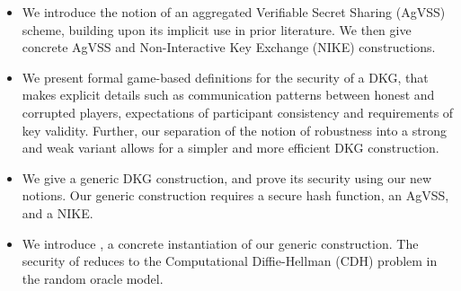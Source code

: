 \begin{itemize}
  \item We introduce the notion of an aggregated Verifiable Secret Sharing (AgVSS) scheme,
    building upon its implicit use in prior literature.
    We then give concrete AgVSS and Non-Interactive Key Exchange (NIKE) constructions.
  \item We present formal game-based definitions for the security of a DKG,
    that makes explicit details such as communication patterns between honest and corrupted players,
    expectations of participant consistency and requirements of key validity.
    Further, our separation of the notion of robustness into a strong and weak variant allows for
    a simpler and more efficient DKG construction.
  \item We give a generic DKG construction,
    and prove its security using our new notions.
    Our generic construction requires a secure hash function, an AgVSS, and a NIKE.
  \item We introduce \RG, a concrete instantiation of our generic
    construction.
    The security of \RG reduces to the Computational Diffie-Hellman (CDH)
    problem in the random oracle model.
\end{itemize}


